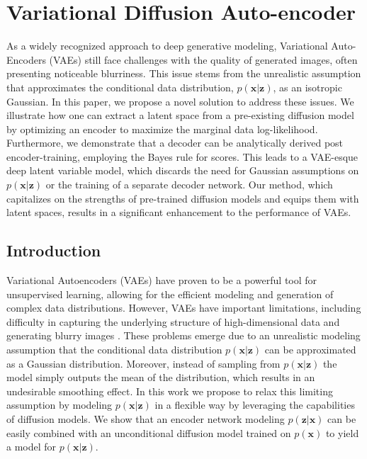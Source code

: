 \chapter{Variational Diffusion Auto-encoder}\label{Chapter:ScoreVAE}

\ifpdf
    \graphicspath{{Chapter3/Figs/Raster/}{Chapter3/Figs/PDF/}{Chapter3/Figs/}}
\else
    \graphicspath{{Chapter3/Figs/Vector/}{Chapter3/Figs/}}
\fi

As a widely recognized approach to deep generative modeling, Variational Auto-Encoders (VAEs) still face challenges with the quality of generated images, often presenting noticeable blurriness. This issue stems from the unrealistic assumption that approximates the conditional data distribution, $p(\textbf{x} | \textbf{z})$, as an isotropic Gaussian. In this paper, we propose a novel solution to address these issues. We illustrate how one can extract a latent space from a pre-existing diffusion model by optimizing an encoder to maximize the marginal data log-likelihood. Furthermore, we demonstrate that a decoder can be analytically derived post encoder-training, employing the Bayes rule for scores. This leads to a VAE-esque deep latent variable model, which discards the need for Gaussian assumptions on $p(\textbf{x} | \textbf{z})$ or the training of a separate decoder network. Our method, which capitalizes on the strengths of pre-trained diffusion models and equips them with latent spaces, results in a significant enhancement to the performance of VAEs.

\section{Introduction}
Variational Autoencoders (VAEs) \cite{vae} have proven to be a powerful tool for unsupervised learning, allowing for the efficient modeling and generation of complex data distributions. However, VAEs have important limitations, including difficulty in capturing the underlying structure of high-dimensional data and generating blurry images \cite{zaho2017understanding_vaes}. These problems emerge due to an unrealistic modeling assumption that the conditional data distribution $p(\textbf{x}| \textbf{z})$ can be approximated as a Gaussian distribution. Moreover, instead of sampling from $p(\textbf{x}| \textbf{z})$ the model simply outputs the mean of the distribution, which results in an undesirable smoothing effect. In this work we propose to relax this limiting assumption by modeling $p(\textbf{x}| \textbf{z})$ in a flexible way by leveraging the capabilities of diffusion models. We show that an encoder network modeling $p( \textbf{z} | \textbf{x})$ can be easily combined with an unconditional diffusion model trained on $p(\textbf{x})$ to yield a model for $p(\textbf{x} | \textbf{z})$.

